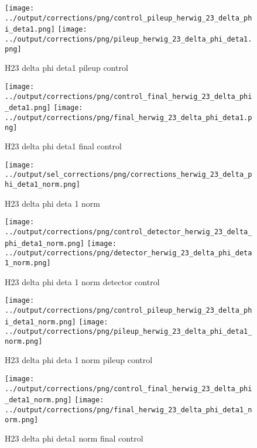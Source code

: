 \documentclass[11pt]{book}
\begin{document}
\begin{figure}[ht]
\centering
\texttt{[image: ../output/corrections/png/control\_pileup\_herwig\_23\_delta\_phi\_deta1.png]}
\texttt{[image: ../output/corrections/png/pileup\_herwig\_23\_delta\_phi\_deta1.png]}
\caption{H23 delta phi deta1 pileup control}
\label{fig:H23_delta_phi_deta1_pileup_control}
\end{figure}


\begin{figure}[ht]
\centering
\texttt{[image: ../output/corrections/png/control\_final\_herwig\_23\_delta\_phi\_deta1.png]}
\texttt{[image: ../output/corrections/png/final\_herwig\_23\_delta\_phi\_deta1.png]}
\caption{H23 delta phi deta1 final control}
\label{fig:H23_delta_phi_deta1_final_control}
\end{figure}

\begin{figure}[ht]
\centering
\texttt{[image: ../output/sel\_corrections/png/corrections\_herwig\_23\_delta\_phi\_deta1\_norm.png]}
\caption{H23 delta phi deta 1 norm}
\label{fig:H23_delta_phi_deta1_norm}
\end{figure}

\begin{figure}[ht]
\centering
\texttt{[image: ../output/corrections/png/control\_detector\_herwig\_23\_delta\_phi\_deta1\_norm.png]}
\texttt{[image: ../output/corrections/png/detector\_herwig\_23\_delta\_phi\_deta1\_norm.png]}
\caption{H23 delta phi deta 1 norm detector control}
\label{fig:H23_delta_phi_deta1_norm_detector_control}
\end{figure}

\begin{figure}[ht]
\centering
\texttt{[image: ../output/corrections/png/control\_pileup\_herwig\_23\_delta\_phi\_deta1\_norm.png]}
\texttt{[image: ../output/corrections/png/pileup\_herwig\_23\_delta\_phi\_deta1\_norm.png]}
\caption{H23 delta phi deta 1 norm pileup control}
\label{fig:H23_delta_phi_deta1_norm_pileup_control}
\end{figure}

\begin{figure}[ht]
\centering
\texttt{[image: ../output/corrections/png/control\_final\_herwig\_23\_delta\_phi\_deta1\_norm.png]}
\texttt{[image: ../output/corrections/png/final\_herwig\_23\_delta\_phi\_deta1\_norm.png]}
\caption{H23 delta phi deta1 norm final control}
\label{fig:H23_delta_phi_deta1_norm_final_control}
\end{figure}
\end{document}
